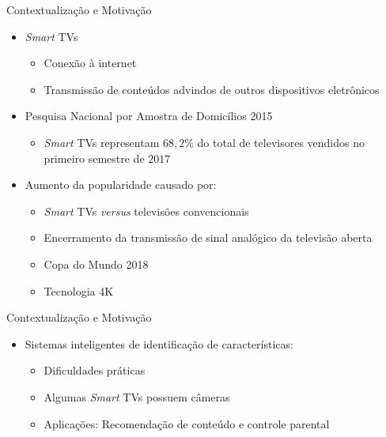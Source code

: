 \begin{frame}{Contextualização e Motivação}
         \ \  \\[0.1cm]
    \begin{itemize}

      \item \alert{\emph{Smart} TVs}
      \begin{itemize}
          \item Conexão à internet
          \item Transmissão de conteúdos advindos de outros dispositivos eletrônicos\ \ \newline
      \end{itemize}

      \item Pesquisa Nacional por Amostra de Domicílios  2015
      \begin{itemize}
        \item \emph{Smart} TVs representam $68,2\%$ do total de televisores vendidos no primeiro semestre de $2017$\ \ \newline
      \end{itemize}
      \item Aumento da popularidade causado por:
      \begin{itemize}
        \item \emph{Smart} TVs \emph{versus} televisões convencionais
        \item Encerramento da transmissão de sinal analógico da televisão aberta
        \item Copa do Mundo 2018
        \item Tecnologia 4K
      \end{itemize}

    \end{itemize}
\end{frame}

\begin{frame}{Contextualização e Motivação}
   \ \  \\[0.1cm]
  \begin{itemize}
  \item Sistemas inteligentes de identificação de características:
  \begin{itemize}
    \item Dificuldades práticas
    \ \ \newline
    \item Algumas \emph{Smart} TVs possuem câmeras
    \ \ \newline
    \item Aplicações: Recomendação de conteúdo e controle parental
  \end{itemize}
  \end{itemize}

\end{frame}

